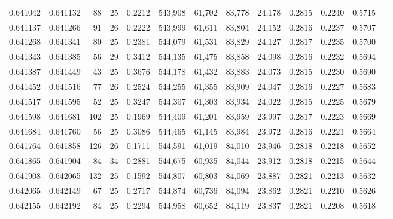 \begin{tabular}{rrrrrrrrrrrrr}
0.641042 & 0.641132 &  88 &  25 &                                     0.2212 & 543,908 &  61,702 &  83,778 &  24,178 & 0.2815 & 0.2240 & 0.5715 \\
0.641137 & 0.641266 &  91 &  26 &                                     0.2222 & 543,999 &  61,611 &  83,804 &  24,152 & 0.2816 & 0.2237 & 0.5707 \\
0.641268 & 0.641341 &  80 &  25 &                                     0.2381 & 544,079 &  61,531 &  83,829 &  24,127 & 0.2817 & 0.2235 & 0.5700 \\
0.641343 & 0.641385 &  56 &  29 &                                     0.3412 & 544,135 &  61,475 &  83,858 &  24,098 & 0.2816 & 0.2232 & 0.5694 \\
0.641387 & 0.641449 &  43 &  25 &                                     0.3676 & 544,178 &  61,432 &  83,883 &  24,073 & 0.2815 & 0.2230 & 0.5690 \\
0.641452 & 0.641516 &  77 &  26 &                                     0.2524 & 544,255 &  61,355 &  83,909 &  24,047 & 0.2816 & 0.2227 & 0.5683 \\
0.641517 & 0.641595 &  52 &  25 &                                     0.3247 & 544,307 &  61,303 &  83,934 &  24,022 & 0.2815 & 0.2225 & 0.5679 \\
0.641598 & 0.641681 & 102 &  25 &                                     0.1969 & 544,409 &  61,201 &  83,959 &  23,997 & 0.2817 & 0.2223 & 0.5669 \\
0.641684 & 0.641760 &  56 &  25 &                                     0.3086 & 544,465 &  61,145 &  83,984 &  23,972 & 0.2816 & 0.2221 & 0.5664 \\
0.641764 & 0.641858 & 126 &  26 &                                     0.1711 & 544,591 &  61,019 &  84,010 &  23,946 & 0.2818 & 0.2218 & 0.5652 \\
0.641865 & 0.641904 &  84 &  34 &                                     0.2881 & 544,675 &  60,935 &  84,044 &  23,912 & 0.2818 & 0.2215 & 0.5644 \\
0.641908 & 0.642065 & 132 &  25 &                                     0.1592 & 544,807 &  60,803 &  84,069 &  23,887 & 0.2821 & 0.2213 & 0.5632 \\
0.642065 & 0.642149 &  67 &  25 &                                     0.2717 & 544,874 &  60,736 &  84,094 &  23,862 & 0.2821 & 0.2210 & 0.5626 \\
0.642155 & 0.642192 &  84 &  25 &                                     0.2294 & 544,958 &  60,652 &  84,119 &  23,837 & 0.2821 & 0.2208 & 0.5618 \\

\end{tabular}
